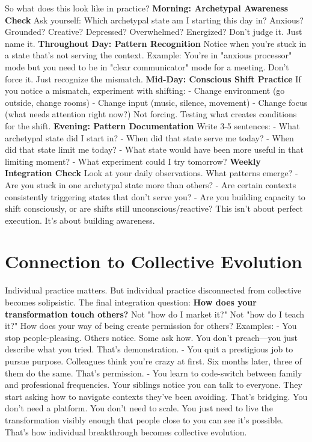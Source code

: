 \documentclass[12pt,openany]{book}
\begin{document}
So what does this look like in practice?
\textbf{Morning: Archetypal Awareness Check}
Ask yourself: Which archetypal state am I starting this day in?
Anxious? Grounded? Creative? Depressed? Overwhelmed? Energized?
Don't judge it. Just name it.
\textbf{Throughout Day: Pattern Recognition}
Notice when you're stuck in a state that's not serving the context.
Example: You're in "anxious processor" mode but you need to be in "clear communicator" mode for a meeting.
Don't force it. Just recognize the mismatch.
\textbf{Mid-Day: Conscious Shift Practice}
If you notice a mismatch, experiment with shifting:
- Change environment (go outside, change rooms)
- Change input (music, silence, movement)
- Change focus (what needs attention right now?)
Not forcing. Testing what creates conditions for the shift.
\textbf{Evening: Pattern Documentation}
Write 3-5 sentences:
- What archetypal state did I start in?
- When did that state serve me today?
- When did that state limit me today?
- What state would have been more useful in that limiting moment?
- What experiment could I try tomorrow?
\textbf{Weekly Integration Check}
Look at your daily observations. What patterns emerge?
- Are you stuck in one archetypal state more than others?
- Are certain contexts consistently triggering states that don't serve you?
- Are you building capacity to shift consciously, or are shifts still unconscious/reactive?
This isn't about perfect execution. It's about building awareness.

\section{Connection to Collective Evolution}

Individual practice matters. But individual practice disconnected from collective becomes solipsistic.
The final integration question:
\textbf{How does your transformation touch others?}
Not "how do I market it?" Not "how do I teach it?" How does your way of being create permission for others?
Examples:
- You stop people-pleasing. Others notice. Some ask how. You don't preach—you just describe what you tried. That's demonstration.
- You quit a prestigious job to pursue purpose. Colleagues think you're crazy at first. Six months later, three of them do the same. That's permission.
- You learn to code-switch between family and professional frequencies. Your siblings notice you can talk to everyone. They start asking how to navigate contexts they've been avoiding. That's bridging.
You don't need a platform. You don't need to scale.
You just need to live the transformation visibly enough that people close to you can see it's possible.
That's how individual breakthrough becomes collective evolution.
\end{document}
